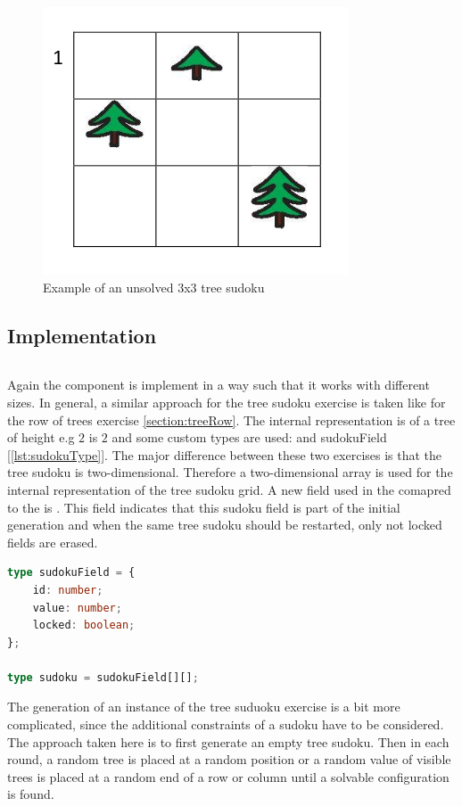 \begin{figure} 
    \centering
    \includegraphics[width=0.4 \columnwidth]{figures/tree_sudoku_example.png}
    \caption{Example of an unsolved 3x3 tree sudoku} 
    \label{fig:tree_sudoku_example} 
\end{figure}

\subsection{Implementation}

\begin{lstlisting}[language=TypeScript,caption={},label={lst:}]
\end{lstlisting}

Again the  component is implement in a way such that it works with different sizes. In general, a similar approach for the tree sudoku exercise is taken like for the row of trees exercise \ref{section:treeRow}. The internal representation is of a tree of height e.g $2$ is $2$ and some custom types are used:  and {sudokuField} [\ref{lst:sudokuType}]. The major difference between these two exercises is that the tree sudoku is two-dimensional. Therefore a two-dimensional array is used for the internal representation of the tree sudoku grid. A new field used in the  comapred to the  is . This field indicates that this sudoku field is part of the initial generation and when the same tree sudoku should be restarted, only not locked fields are erased.

\begin{lstlisting}[language=TypeScript,caption={Definition of the custom sudoku and sudokuField type},label={lst:sudokuType}]
type sudokuField = {
    id: number;
    value: number;
    locked: boolean;
};

type sudoku = sudokuField[][];
\end{lstlisting}

The generation of an instance of the tree suduoku exercise is a bit more complicated, since the additional constraints of a sudoku have to be considered. The approach taken here is to first generate an empty tree sudoku. Then in each round, a random tree is placed at a random position or a random value of visible trees is placed at a random end of a row or column until a solvable configuration is found. 

